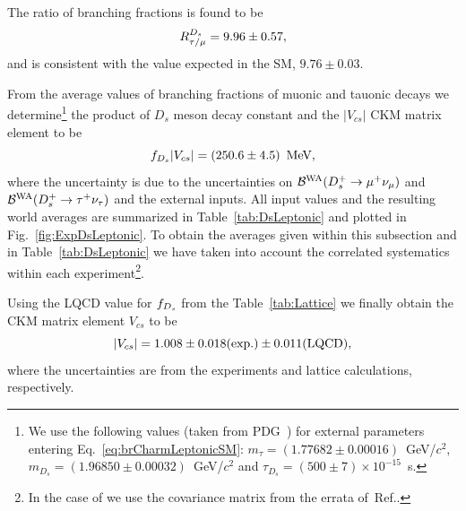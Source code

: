 The ratio of branching fractions is found to be
\[
R_{\tau/\mu}^{D_{s}} = 9.96\pm0.57,
\]
and is consistent with the value expected in the SM, $9.76\pm0.03$.

From the average values of branching fractions of muonic and tauonic decays we determine\footnote{
We use the following values (taken from PDG~\cite{PDG_2012}) for external parameters entering 
Eq.~\ref{eq:brCharmLeptonicSM}: $m_{\tau} = (1.77682\pm0.00016)$~GeV/$c^2$, $m_{D_s} = (1.96850\pm0.00032)$~GeV/$c^2$ 
and $\tau_{D_s} = (500\pm7)\times 10^{-15}$~s.} the product of $D_s$ meson decay constant and 
the $|V_{cs}|$ CKM matrix element to be
\begin{equation}
 f_{D_s}|V_{cs}|=\left(250.6\pm4.5\right)~\mbox{MeV},
 \label{eq:expFDSVCS}
\end{equation}
where the uncertainty is due to the uncertainties on ${\cal B}^{\rm WA}(D_s^+\to\mu^+\nu_{\mu})$ and 
${\cal B}^{\rm WA}(D_s^+\to\tau^+\nu_{\tau})$ and the external inputs. All input values and the resulting world averages are 
summarized in Table~\ref{tab:DsLeptonic} and plotted in Fig.~\ref{fig:ExpDsLeptonic}. To obtain the 
averages given within this subsection and in Table~\ref{tab:DsLeptonic} we have taken into account
the correlated systematics within each experiment\footnote{In the case of \babar we use the covariance matrix from the errata of~Ref.\cite{delAmoSanchez:2010jg}.}.

Using the LQCD value for $f_{D_s}$ from the Table~\ref{tab:Lattice} we 
finally obtain the CKM matrix element $V_{cs}$ to be
\[
 |V_{cs}| = 1.008\pm0.018(\rm exp.)\pm0.011(\rm LQCD),
\]
where the uncertainties are from the experiments and lattice calculations, respectively.

